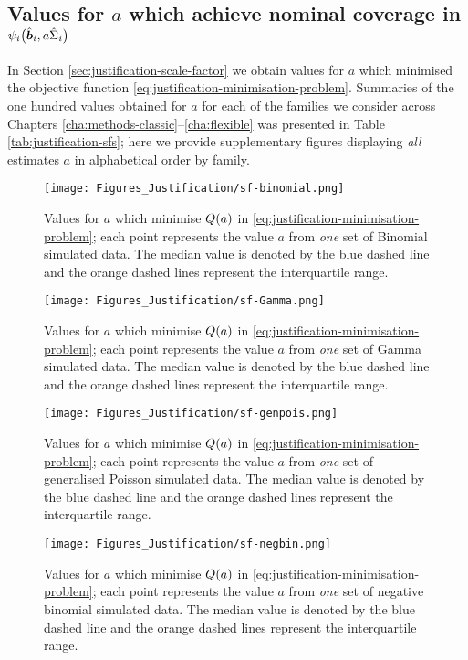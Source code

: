 \subsection{Values for \texorpdfstring{$a$}{a} which achieve nominal coverage in \texorpdfstring{$\psi_i\big(\hat{\bm{b}}_i,a\hat{\Sigma}_i\big)$}{psib}}\label{sec:appendix-suppfigs-justification-scalefactor}
In Section \ref{sec:justification-scale-factor} we obtain values for $a$ which minimised the objective function \eqref{eq:justification-minimisation-problem}. Summaries of the one hundred values obtained for $a$ for each of the families we consider across Chapters \ref{cha:methods-classic}--\ref{cha:flexible} was presented in Table \ref{tab:justification-sfs}; here we provide supplementary figures displaying \textit{all} estimates $a$ in alphabetical order by family.
\begin{figure}[ht]
    \centering
    \texttt{[image: Figures\_Justification/sf-binomial.png]}
    \caption{Values for $a$ which minimise $Q\!\left( a\right)$ in \eqref{eq:justification-minimisation-problem}; each point represents the value $a$ from \textit{one} set of Binomial simulated data. The median value is denoted by the blue dashed line and the orange dashed lines represent the interquartile range.}
    \label{fig:justification-scalefactor-binomial}
\end{figure}
\begin{figure}[ht]
    \centering
    \texttt{[image: Figures\_Justification/sf-Gamma.png]}
    \caption{Values for $a$ which minimise $Q\!\left( a\right)$ in \eqref{eq:justification-minimisation-problem}; each point represents the value $a$ from \textit{one} set of Gamma simulated data. The median value is denoted by the blue dashed line and the orange dashed lines represent the interquartile range.}
    \label{fig:justification-scalefactor-Gamma}
\end{figure}
\begin{figure}[ht]
    \centering
    \texttt{[image: Figures\_Justification/sf-genpois.png]}
    \caption{Values for $a$ which minimise $Q\!\left( a\right)$ in \eqref{eq:justification-minimisation-problem}; each point represents the value $a$ from \textit{one} set of generalised Poisson simulated data. The median value is denoted by the blue dashed line and the orange dashed lines represent the interquartile range.}
    \label{fig:justification-scalefactor-genpois}
\end{figure}
\begin{figure}[ht]
    \centering
    \texttt{[image: Figures\_Justification/sf-negbin.png]}
    \caption{Values for $a$ which minimise $Q\!\left( a\right)$ in \eqref{eq:justification-minimisation-problem}; each point represents the value $a$ from \textit{one} set of negative binomial simulated data. The median value is denoted by the blue dashed line and the orange dashed lines represent the interquartile range.}
    \label{fig:justification-scalefactor-negbin}
\end{figure}
